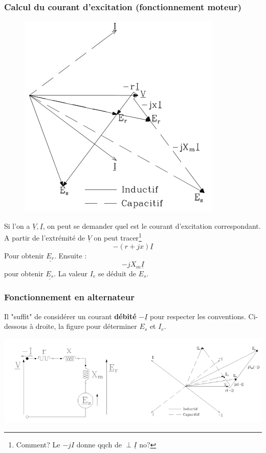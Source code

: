 		\subsubsection{Calcul du courant d'excitation (fonctionnement moteur)}
		\begin{figure}
		\vspace{-5mm}
		\includegraphics[scale=0.4]{ch7/image6.png}
		\end{figure}			
		Si l'on a $\underline{V},\underline{I}$, on peut se demander quel est le courant 
		d'excitation correspondant. A partir de l'extrémité de $\underline{V}$ on peut 
		tracer\footnote{Comment? Le $-jI$ donne qqch de $\perp \underline{I}$ no?}
		\begin{equation}
		-(r+jx)\underline{I}
		\end{equation}
		Pour obtenir $\underline{E_r}$. Ensuite : 
		\begin{equation}
		-jX_m\underline{I}
		\end{equation}
		pour obtenir $\underline{E_s}$. La valeur $I_e$ se déduit de $E_s$.\\
		
		\vspace{1cm}
		
		\subsubsection{Fonctionnement en alternateur}
		Il "suffit" de considérer un courant \textbf{débité} $-\underline{I}$ pour 
		respecter les conventions. Ci-dessous à droite, la figure pour déterminer $E_s$ et 
		$I_e$.
		\begin{center}
		\includegraphics[scale=0.5]{ch7/image5.png}
		\label{fig:SchEqGen}
		\end{center}
		
